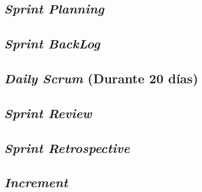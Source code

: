 	\subsection{\textit{Sprint Planning}}
	\subsection{\textit{Sprint BackLog}}
	\subsection{\textit{Daily Scrum} (Durante 20 d\'{i}as)}
	\subsection{\textit{Sprint Review}}
	\subsection{\textit{Sprint Retrospective}}
	
	\subsection{\textit{Increment}}